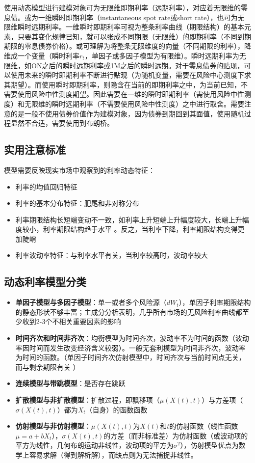 \documentclass[11pt]{article}
\begin{document}
使用动态模型进行建模对象可为无限维即期利率（远期利率），对应着无限维的零息债。或为一维瞬时即期利率（instantaneous spot rate或short rate），也可为无限维瞬时远期利率。一维瞬时即期利率可视为整条利率曲线（期限结构）的基本元素，只要其变化规律已知，就可以张成不同期限（无限维）的即期利率（不同到期期限的零息债券价格）。或可理解为将整条无限维度的向量（不同期限的利率），降维成一个变量（瞬时利率$r_t$，单因子或多因子模型为有限维）。瞬时远期利率为无限维，如ON之后的瞬时远期利率或1M之后的瞬时远期。对于零息债券的贴现，可以使用未来的瞬时即期利率不断进行贴现（为随机变量，需要在风险中心测度下求其期望）。而使用瞬时即期利率，则隐含在当前的即期利率之中，为当前已知，不需要使用风险中性测度期望。因此需要在一维的瞬时即期利率（需使用风险中性测度）和无限维的瞬时远期利率（不需要使用风险中性测度）之中进行取舍。需要注意的是一般不使用债券价值作为建模对象，因为债券到期回到其面值，使用随机过程显然不合适，需要使用到布朗桥。

\subsection{实用注意标准}

模型需要反映现实市场中观察到的利率动态特征：
\begin{itemize}
    \item 利率的均值回归特征
    \item 利率的基本分布特征：肥尾和非对称分布
    \item 利率期限结构长短端变动不一致，如利率上升短端上升幅度较大，长端上升幅度较小，利率期限结构趋于水平 。反之，当利率下降，利率期限结构变得更加陡峭
    \item 利率波动率特征：与利率水平有关，当利率较高时，波动率较大
\end{itemize}

\subsection{动态利率模型分类}

\begin{itemize}
    \item \textbf{单因子模型与多因子模型}：单一或者多个风险源（$dW_t$），单因子利率期限结构的静态形状不够丰富；主成分分析表明，几乎所有市场的无风险利率曲线都至少收到2-3个不相关重要因素的影响
    \item \textbf{时间齐次和时间非齐次}：均衡模型为时间齐次，波动率不为时间的函数（波动率因时间而发生改变经济含义较弱）。一般无套利模型为时间非齐次，波动率为时间的函数。（单因子时间齐次仿射模型中，时间齐次与当前时间点无关，而与剩余期限有关 ）
    \item \textbf{连续模型与带跳模型}：是否存在跳跃
    \item \textbf{扩散模型与非扩散模型}：扩散过程，即飘移项（$\mu(X(t),t)$）与方差项（$\sigma(X(t),t)$）都为$X_t$（自身）的函数函数
    \item \textbf{仿射模型与非仿射模型}：$\mu(X(t),t)$为$X(t)$和$t$的仿射函数（线性函数$\mu=a+bX_t$），$\sigma(X(t),t)$的方差（而非标准差）为仿射函数（或波动项的平方为线性，几何布朗运动非线性，波动项的平方为$\sigma^2$），仿射模型优点为数学上容易求解（得到解析解），而缺点则为无法捕捉非线性。
\end{itemize}
\end{document}
